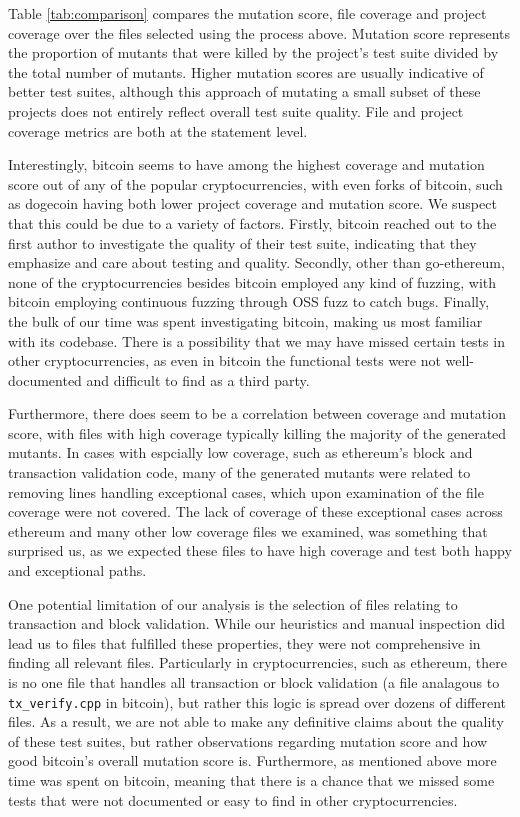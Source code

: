Table \ref{tab:comparison} compares the mutation score, file coverage and project coverage over the files selected using the process above. Mutation score represents the proportion
of mutants that were killed by the project's test suite divided by the total number of mutants. Higher mutation scores are usually indicative of better test suites, although this approach
of mutating a small subset of these projects does not entirely reflect overall test suite quality. File and project coverage metrics are both at the statement level.

Interestingly, bitcoin seems to have among the highest coverage and mutation score out of any of the popular cryptocurrencies, with even forks of bitcoin, such as dogecoin having both lower
project coverage and mutation score. We suspect that this could be due to a variety of factors. Firstly, bitcoin reached out to the first author to investigate the quality of their test suite,
indicating that they emphasize and care about testing and quality. Secondly, other than go-ethereum, none of the cryptocurrencies besides bitcoin employed any kind of fuzzing, with bitcoin
employing continuous fuzzing through OSS fuzz to catch bugs. Finally, the bulk of our time was spent investigating bitcoin, making us most familiar with its codebase. There is a possibility
that we may have missed certain tests in other cryptocurrencies, as even in bitcoin the functional tests were not well-documented and difficult to find as a third party.

Furthermore, there does seem to be a correlation between coverage and mutation score, with files with high coverage typically killing the majority of the generated mutants. In cases with espcially
low coverage, such as ethereum's block and transaction validation code, many of the generated mutants were related to removing lines handling exceptional cases, which upon examination of the
file coverage were not covered. The lack of coverage of these exceptional cases across ethereum and many other low coverage files we examined, was something that surprised us, as we expected these files to have
high coverage and test both happy and exceptional paths.

One potential limitation of our analysis is the selection of files relating to transaction and block validation. While our heuristics and manual inspection did lead us to files that fulfilled these
properties, they were not comprehensive in finding all relevant files. Particularly in cryptocurrencies, such as ethereum, there is no one file that handles all transaction or block validation (a file analagous
to {\tt tx\_verify.cpp}  in bitcoin), but rather this logic is spread over dozens of different files. As a result, we are not able to make any definitive claims about the quality of these test suites, but rather
observations regarding mutation score and how good bitcoin's overall mutation score is. Furthermore, as mentioned above more time was spent on bitcoin, meaning that there is a chance that we missed
some tests that were not documented or easy to find in other cryptocurrencies.

